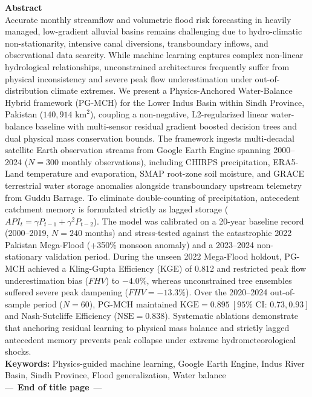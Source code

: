 \documentclass[11pt,a4paper,fleqn]{article}
\begin{document}
\begin{singlespace}
\noindent \textbf{Abstract}\\
Accurate monthly streamflow and volumetric flood risk forecasting in heavily managed, low-gradient alluvial basins remains challenging due to hydro-climatic non-stationarity, intensive canal diversions, transboundary inflows, and observational data scarcity. While machine learning captures complex non-linear hydrological relationships, unconstrained architectures frequently suffer from physical inconsistency and severe peak flow underestimation under out-of-distribution climate extremes. We present a Physics-Anchored Water-Balance Hybrid framework (PG-MCH) for the Lower Indus Basin within Sindh Province, Pakistan ($140,914\text{ km}^2$), coupling a non-negative, L2-regularized linear water-balance baseline with multi-sensor residual gradient boosted decision trees and dual physical mass conservation bounds. The framework ingests multi-decadal satellite Earth observation streams from Google Earth Engine spanning 2000--2024 ($N=300$ monthly observations), including CHIRPS precipitation, ERA5-Land temperature and evaporation, SMAP root-zone soil moisture, and GRACE terrestrial water storage anomalies alongside transboundary upstream telemetry from Guddu Barrage. To eliminate double-counting of precipitation, antecedent catchment memory is formulated strictly as lagged storage ($API_t = \gamma P_{t-1} + \gamma^2 P_{t-2}$). The model was calibrated on a 20-year baseline record (2000--2019, $N=240$ months) and stress-tested against the catastrophic 2022 Pakistan Mega-Flood (+350\% monsoon anomaly) and a 2023--2024 non-stationary validation period. During the unseen 2022 Mega-Flood holdout, PG-MCH achieved a Kling-Gupta Efficiency (KGE) of 0.812 and restricted peak flow underestimation bias ($FHV$) to $-4.0\%$, whereas unconstrained tree ensembles suffered severe peak dampening ($FHV = -13.3\%$). Over the 2020--2024 out-of-sample period ($N=60$), PG-MCH maintained $\text{KGE} = 0.895\ [95\%\text{ CI: } 0.73, 0.93]$ and Nash-Sutcliffe Efficiency ($\text{NSE} = 0.838$). Systematic ablations demonstrate that anchoring residual learning to physical mass balance and strictly lagged antecedent memory prevents peak collapse under extreme hydrometeorological shocks.\\[1.2em]

\noindent \textbf{Keywords:} Physics-guided machine learning, Google Earth Engine, Indus River Basin, Sindh Province, Flood generalization, Water balance\\[1.5em]

\noindent ---\ \textbf{End of title page}\ ---
\end{singlespace}
\end{document}

